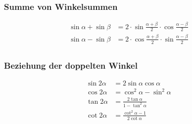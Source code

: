 \subsubsection{Summe von Winkelsummen}
\begin{align*}
\sin{\alpha} + \sin{\beta}  &= 2 \cdot \sin{\frac{\alpha+\beta}{2}} \cdot \cos{\frac{\alpha-\beta}{2}} \\
\sin{\alpha} - \sin{\beta}  &= 2 \cdot \cos{\frac{\alpha+\beta}{2}} \cdot \sin{\frac{\alpha-\beta}{2}} \\
\end{align*}

\subsubsection{Beziehung der doppelten Winkel}
\begin{align*}
\sin{ 2\alpha} &= 2 \sin{ \alpha} \cos{ \alpha} \\
\cos{ 2\alpha} &= \cos^2{ \alpha} - \sin^2{ \alpha} \\
\tan{ 2\alpha} &= \frac{2 \tan{\alpha}}{1-\tan^2{\alpha}} \\
\cot{ 2\alpha} &= \frac{\cot^2{\alpha}-1}{ 2 \cot{\alpha}}
\end{align*}




